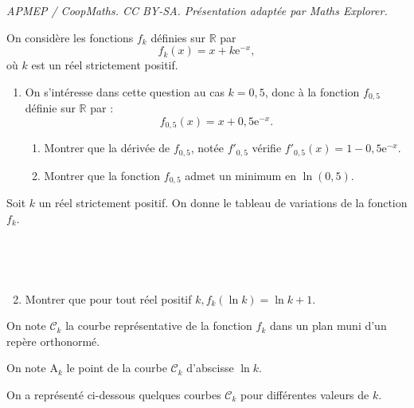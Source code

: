 \documentclass[10pt]{article}
\providecommand{\R}{\mathbb{R}}
\providecommand{\e}{{\mathrm{e}}}
\begin{document}
\noindent\textit{APMEP / CoopMaths. CC BY-SA. Présentation adaptée par Maths Explorer.}\par\medskip
On considère les fonctions $f_{k}$ définies sur $\R$ par 
\[f_{k}(x) = x + k \e^{-x},\]
 où $k$ est un réel strictement positif.

	\begin{enumerate}
		\item On s'intéresse dans cette question au cas $k = 0,5$, donc à la fonction $f_{0,5}$ définie sur $\R$ par :
\[f_{0,5}(x) = x + 0,5 \e^{-x}.\]

\smallskip
	\begin{enumerate}
		\item Montrer que la dérivée de $f_{0,5}$, notée $f'{ }_{0,5}$ vérifie $f'{ }_{0,5}(x) = 1-0,5 \e^{-x}$.

		\item Montrer que la fonction $f_{0,5}$ admet un minimum en $\ln (0,5)$.
	\end{enumerate}
\end{enumerate}

		Soit $k$ un réel strictement positif. On donne le tableau de variations de la fonction $f_{k}$.
		\medskip
		

					\hfill~\hfill~

	\begin{enumerate}
		\setcounter{enumi}{1}
		\item Montrer que pour tout réel positif $k, f_{k}(\ln k) = \ln k + 1$.
	\end{enumerate}

On note $\mathcal{C}_{k}$ la courbe représentative de la fonction $f_{k}$ dans un plan muni d'un repère orthonormé.

On note $\mathrm{A}_{k}$ le point de la courbe $\mathcal{C}_{k}$ d'abscisse $\ln k$.

On a représenté ci-dessous quelques courbes $\mathcal{C}_{k}$ pour différentes valeurs de $k$.
\end{document}
